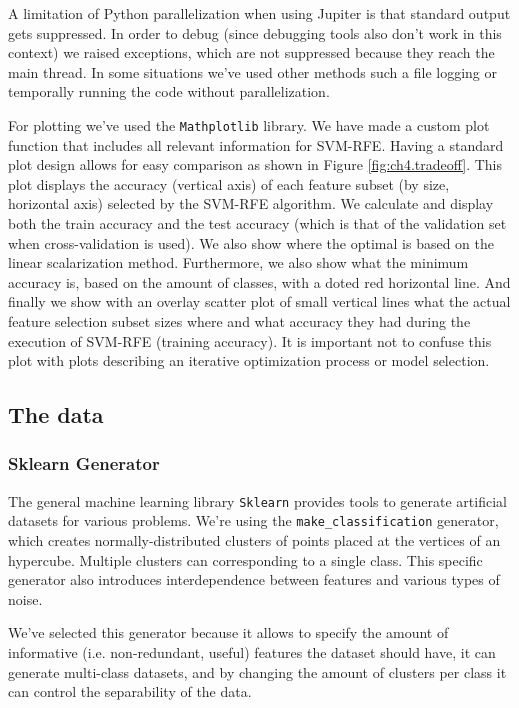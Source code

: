 A limitation of Python parallelization when using Jupiter is that standard output gets suppressed. In order to debug (since debugging tools also don't work in this context) we raised exceptions, which are not suppressed because they reach the main thread. In some situations we've used other methods such a file logging or temporally running the code without parallelization.

For plotting we've used the \texttt{Mathplotlib} library. We have made a custom plot function that includes all relevant information for SVM-RFE. Having a standard plot design allows for easy comparison as shown in Figure \ref{fig:ch4.tradeoff}. This plot displays the accuracy (vertical axis) of each feature subset (by size, horizontal axis) selected by the SVM-RFE algorithm. We calculate and display both the train accuracy and the test accuracy (which is that of the va\-lid\-ation set when cross-validation is used). We also show where the optimal is based on the linear scalarization method. Furthermore, we also show what the minimum accuracy is, based on the amount of classes, with a doted red horizontal line. And finally we show with an overlay scatter plot of small vertical lines what the actual feature selection subset sizes where and what accuracy they had during the execution of SVM-RFE (training accuracy). It is important not to confuse this plot with plots describing an iterative optimization process or model selection.

\subsection{The data}

\subsubsection*{Sklearn Generator}

The general machine learning library \texttt{Sklearn} provides tools to generate artificial datasets for various prob\-lems. We're using the \texttt{make\_classification} gen\-er\-a\-tor, which creates normally-distributed clus\-ters of points placed at the vertices of an hypercube. Multiple clusters can corresponding to a single class. This specific gen\-er\-a\-tor also introduces in\-ter\-de\-pen\-dence between features and var\-i\-ous types of noise.

We've selected this generator because it allows to specify the amount of in\-for\-ma\-tive (i.e. non-redundant, useful) features the dataset should have, it can generate multi-class datasets, and by changing the amount of clusters per class it can control the separability of the data.

